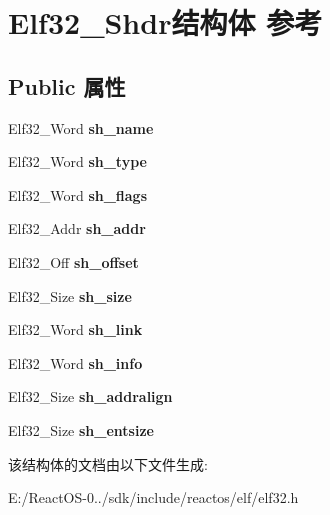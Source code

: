 \hypertarget{struct_elf32___shdr}{}\section{Elf32\+\_\+\+Shdr结构体 参考}
\label{struct_elf32___shdr}
\subsection*{Public 属性}
\begin{DoxyCompactItemize}
\item 
\mbox{\label{struct_elf32___shdr_a6e8fd300ca473a31d0f65817ce371dfd}} 
Elf32\+\_\+\+Word {\bfseries sh\+\_\+name}
\item 
\mbox{\label{struct_elf32___shdr_aab6c221dbd7e16987df41280fb915408}} 
Elf32\+\_\+\+Word {\bfseries sh\+\_\+type}
\item 
\mbox{\label{struct_elf32___shdr_a27e003d8da37de3038a0065577a7743d}} 
Elf32\+\_\+\+Word {\bfseries sh\+\_\+flags}
\item 
\mbox{\label{struct_elf32___shdr_a7e668a62cee74a2f9c6edabb5f45635a}} 
Elf32\+\_\+\+Addr {\bfseries sh\+\_\+addr}
\item 
\mbox{\label{struct_elf32___shdr_a6e37227a5777cddc0a9dbbb3c2598ec1}} 
Elf32\+\_\+\+Off {\bfseries sh\+\_\+offset}
\item 
\mbox{\label{struct_elf32___shdr_ab660982396386f05e14f5dd66578b47c}} 
Elf32\+\_\+\+Size {\bfseries sh\+\_\+size}
\item 
\mbox{\label{struct_elf32___shdr_ad759308388eb14c5c6e4d636c38999da}} 
Elf32\+\_\+\+Word {\bfseries sh\+\_\+link}
\item 
\mbox{\label{struct_elf32___shdr_aef63fe62c2c9927f374c4f987954c6e5}} 
Elf32\+\_\+\+Word {\bfseries sh\+\_\+info}
\item 
\mbox{\label{struct_elf32___shdr_a18114458e4d375100d402b5eba120634}} 
Elf32\+\_\+\+Size {\bfseries sh\+\_\+addralign}
\item 
\mbox{\label{struct_elf32___shdr_a2439a7f0536dec3c297cc2017ff48ed4}} 
Elf32\+\_\+\+Size {\bfseries sh\+\_\+entsize}
\end{DoxyCompactItemize}


该结构体的文档由以下文件生成\+:\begin{DoxyCompactItemize}
\item 
E\+:/\+React\+O\+S-\/0../sdk/include/reactos/elf/elf32.\+h\end{DoxyCompactItemize}
